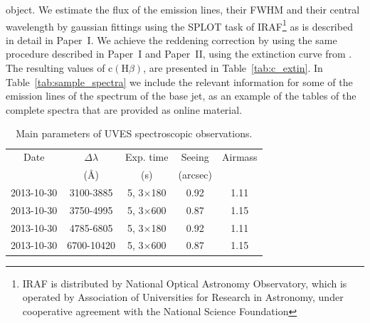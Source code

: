 \documentclass[fleqn,usenatbib]{mnras}
\begin{document}
object. We estimate the flux of the emission lines, their FWHM and their central wavelength by gaussian fittings using the SPLOT task of IRAF\footnote{IRAF is distributed by National Optical Astronomy Observatory, which is operated by Association of Universities for Research in Astronomy, under cooperative agreement with the National Science Foundation} \citep{Tody93} as is described in detail in Paper~I. We achieve the reddening correction by using the same procedure described in Paper~I and Paper~II, using the extinction curve from \citet{Blagrave07}. The resulting values of $\text{c}(\text{H}\beta)$, are presented in Table~\ref{tab:c_extin}. In Table~\ref{tab:sample_spectra} we include the relevant information for some of the emission lines of the spectrum of the base jet, as an example of the tables of the complete spectra that are provided as online material.

\begin{table}
\caption{Main parameters of UVES spectroscopic observations.}
\label{tab:obs_set}
\begin{tabular}{ccccc}
\hline
Date & $\Delta \lambda$& Exp. time  &Seeing &Airmass\\
 & (\AA) &  (s) & (arcsec)&\\
\hline
2013-10-30 & 3100-3885 & 5, 3$\times$180 &0.92&1.11\\
2013-10-30 & 3750-4995 & 5, 3$\times$600 & 0.87 & 1.15\\
2013-10-30 & 4785-6805 & 5, 3$\times$180 &0.92&1.11\\
2013-10-30 & 6700-10420 & 5, 3$\times$600 & 0.87 & 1.15\\
\hline
\end{tabular}
\end{table}
\end{document}

